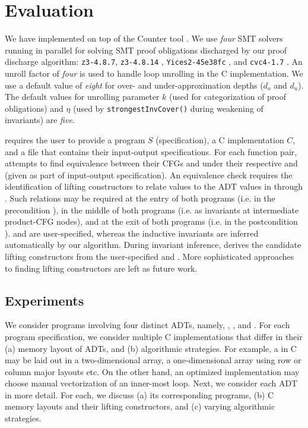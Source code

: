 \chapter{Evaluation}
\label{sec:eval}

We have implemented \toolName{} on top of the Counter tool \cite{oopsla20}.
We use {\em four} SMT solvers running in parallel for solving
SMT proof obligations discharged by our proof discharge algorithm:
{\tt z3-4.8.7}, {\tt z3-4.8.14} \cite{z3}, {\tt Yices2-45e38fc} \cite{yices}, and {\tt cvc4-1.7} \cite{cvc4solver}.
An unroll factor of {\em four} is used to handle loop unrolling in the C implementation.
We use a default value of {\em eight} for over- and under-approximation depths ($d_o$ and $d_u$).
The default values for unrolling parameter $k$ (used for categorization of proof obligations)
and $\eta$ (used by {\tt strongestInvCover()} during weakening of \recursiveRelation{} invariants) are {\em five}.

\toolName{} requires the user to provide a \SpecL{} program $S$ (specification), a C implementation $C$,
and a file that contains their input-output specifications.
For each function pair, \toolName{} attempts to find equivalence between their CFGs \sprog{} and \cprog{}
under their respective \pre{} and \post{} (given as part of input-output specification).
An equivalence check requires the identification of lifting constructors to relate \cprog{}
values to the ADT values in \sprog{} through  \recursiveRelations{}.
Such relations may be required at the entry of both programs (i.e. in the precondition \pre{}),
in the middle of both programs (i.e. as invariants at intermediate product-CFG nodes),
and at the exit of both programs (i.e. in the postcondition \post{}).
\pre{} and \post{} are user-specified, whereas the inductive invariants are
inferred automatically by our algorithm.
During invariant inference, \toolName{} derives the candidate lifting constructors
from the user-specified \pre{} and \post{}.
More sophisticated approaches to finding lifting constructors are left as future work.

\section{Experiments}
\label{sec:experiments}
We consider programs involving four distinct ADTs, namely,
 ,  ,  
and  .
For each \SpecL{} program specification, we consider multiple
C implementations that differ in their (a) memory layout of ADTs, and
(b) algorithmic strategies. For example, a  in C may be laid out
in a two-dimensional array, a one-dimensional array using row or column major
layouts etc. On the other hand, an optimized implementation may choose manual vectorization
of an inner-most loop. Next, we consider each ADT in more detail. For each,
we discuss (a) its corresponding programs, (b) C memory layouts and their lifting
constructors, and (c) varying algorithmic strategies.


